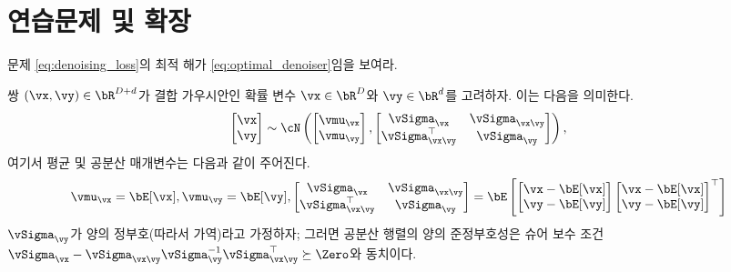 \documentclass[../../book-main_ko.tex]{subfiles}
\begin{document}
\section{연습문제 및 확장}

\begin{exercise}
    문제 \eqref{eq:denoising_loss}의 최적 해가 \eqref{eq:optimal_denoiser}임을 보여라.
\end{exercise}

\begin{exercise}\label{exercise:conditional_gaussian}
  쌍 $(\vx, \vy) \in \bR^{D + d}$가 결합 가우시안인 확률 변수 $\vx \in \bR^D$와 $\vy \in \bR^d$를 고려하자. 이는 다음을 의미한다.
  \begin{equation*}
    \begin{bmatrix}
      \vx \\
      \vy
    \end{bmatrix}
    \sim
    \cN \left(
      \begin{bmatrix}
        \vmu_{\vx} \\
        \vmu_{\vy}
      \end{bmatrix}
      ,
      \begin{bmatrix}
        \vSigma_{\vx} & \vSigma_{\vx\vy} \\
        \vSigma_{\vx\vy}^\top & \vSigma_{\vy}
      \end{bmatrix}
    \right),
  \end{equation*}
  여기서 평균 및 공분산 매개변수는 다음과 같이 주어진다.
  \begin{equation*}
    \vmu_{\vx} = \bE[\vx],     \vmu_{\vy} = \bE[\vy],    
    \begin{bmatrix}
      \vSigma_{\vx} & \vSigma_{\vx\vy} \\
      \vSigma_{\vx\vy}^\top & \vSigma_{\vy}
    \end{bmatrix}
    =
    \bE\left[
      \begin{bmatrix}
        \vx - \bE[\vx] \\
        \vy - \bE[\vy]
      \end{bmatrix}
      \begin{bmatrix}
        \vx - \bE[\vx] \\
        \vy - \bE[\vy]
      \end{bmatrix}^\top
      \right]
  \end{equation*}
  $\vSigma_{\vy}$가 양의 정부호(따라서 가역)라고 가정하자; 그러면 공분산 행렬의 양의 준정부호성은 슈어 보수 조건 $\vSigma_{\vx} - \vSigma_{\vx\vy} \vSigma_{\vy}^{-1}
  \vSigma_{\vx\vy}^\top \succeq \Zero$와 동치이다.


\end{exercise}
\end{document}
